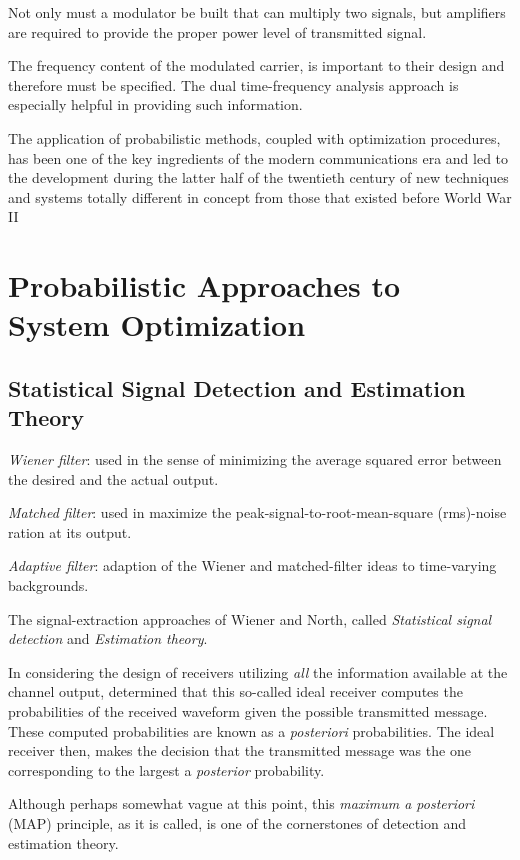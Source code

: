 \documentclass[12pt,a4paper]{book}
\begin{document}
Not only must a modulator be built that can multiply two signals, but amplifiers are required to provide the proper power level of transmitted signal.

The frequency content of the modulated carrier, is important to their design and therefore must be specified. The dual time-frequency analysis approach is especially helpful in providing such information.

The application of probabilistic methods, coupled with optimization procedures, has been one of the key ingredients of the modern communications era and led to the development during the latter half of the 
twentieth century of new techniques and systems totally different in concept from those that existed before World War II

\section{Probabilistic Approaches to System Optimization}
\subsection{Statistical Signal Detection and Estimation Theory}

\textit{Wiener filter}: used in the sense of minimizing the average squared error between the desired and the actual output.

\textit{Matched filter}: used in maximize the peak-signal-to-root-mean-square (rms)-noise ration at its output.

\textit{Adaptive filter}: adaption of the Wiener and matched-filter ideas to time-varying backgrounds.

The signal-extraction approaches of Wiener and North, called \textit{Statistical signal detection} and \textit{Estimation theory}.

In considering the design of receivers utilizing \textit{all} the information available at the channel output, determined that this so-called
ideal receiver computes the probabilities of the received waveform given the possible transmitted message. These computed probabilities are known as a \textit{posteriori} probabilities.
The ideal receiver then, makes the decision that the transmitted message was the one corresponding to the largest a \textit{posterior} probability.

Although perhaps somewhat vague at this point, this \textit{maximum a posteriori} (MAP) principle, as it is called, is one of the cornerstones of detection and estimation theory.
\end{document}
